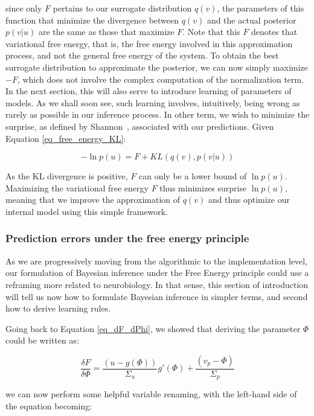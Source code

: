 since only $F$ pertains to our surrogate distribution $q(v)$, the parameters of this function that minimize the divergence between $q(v)$ and the actual posterior $p(v|u)$ are the same as those that maximize $F$. Note that this $F$ denotes that variational free energy, that is, the free energy involved in this approximation process, and not the general free energy of the system. To obtain the best surrogate distribution to approximate the posterior, we can now simply maximize $-F$, which does not involve the complex computation of the normalization term. In the next section, this will also serve to introduce learning of parameters of models. As we shall soon see, such learning involves, intuitively, being wrong as rarely as possible in our inference process. In other term, we wish to minimize the surprise, as defined by Shannon~\cite{shannon1948mathematical}, associated with our predictions. Given Equation \ref{eq_free_energy_KL}:

\begin{equation}
\label{eq_lnpu}
    - \ln p(u) = F+ KL (q(v), p(v|u)) 
\end{equation}

As the \gls{KL} divergence is positive, $F$ can only be a lower bound of $\ln p(u)$. Maximizing the variational free energy $F$ thus minimizes surprise $\ln p(u)$, meaning that we improve the approximation of $q(v)$ and thus optimize our internal model using this simple framework.



\subsubsection{Prediction errors under the free energy principle}
As we are progressively moving from the algorithmic to the implementation level, our formulation of Bayesian inference under the Free Energy principle could use a reframing more related to neurobiology. In that sense, this section of introduction will tell us now how to formulate Bayesian inference in simpler terms, and second how to derive learning rules. 

Going back to Equation \ref{eq_dF_dPhi}, we showed that deriving the parameter $\Phi$ could be written as:

\begin{equation}
    \frac{\delta F}{\delta \Phi} = \frac{(u-g(\Phi))}{\Sigma_u} g'(\Phi)  + \frac{(v_p-\Phi)}{\Sigma_p}  
\end{equation}

we can now perform some helpful variable renaming, with the left-hand side of the equation becoming:

